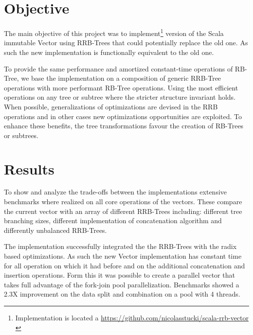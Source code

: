 \section{Objective}
The main objective of this project was to implement\footnote{Implementation is located a \url{https://github.com/nicolasstucki/scala-rrb-vector} \cite{projecRepo}} version of the Scala immutable Vector using RRB-Trees that could potentially replace the old one. As such the new implementation is functionally equivalent to the old one.

To provide the same performance and amortized constant-time operations of RB-Tree, we base the implementation on a composition of generic RRB-Tree operations with more performant RB-Tree operations. Using the most efficient operations on any tree or subtree where the stricter structure invariant holds. When possible, generalizations of optimizations are devised in the RRB operations and in other cases new optimizations opportunities are exploited. To enhance these benefits, the tree transformations favour the creation of RB-Trees or subtrees.


\section{Results}
To show and analyze the trade-offs between the implementations extensive benchmarks where realized on all core operations of the vectors. These compare the current vector with an array of different RRB-Trees including: different tree branching sizes, different implementation of concatenation algorithm and differently unbalanced RRB-Trees.  

The implementation successfully integrated the the RRB-Trees with the radix based optimizations. As such the new Vector implementation has constant time for all operation on which it had before and on the additional concatenation and insertion operations. Form this it was possible to create a parallel vector that takes full advantage of the fork-join pool parallelization. Benchmarks showed a 2.3X improvement on the data split and combination on a pool with 4 threads.

